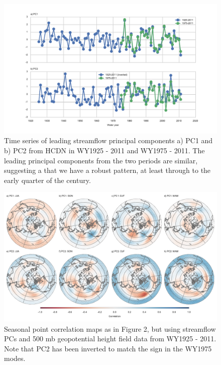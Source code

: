 \documentclass[final, double]{ua-thesis}
\begin{document}
\begin{figure}[ht]
\centering
\centerline{\includegraphics[width=190mm]{p1figures/s4.pdf}}
\caption{Time series of leading streamflow principal components a) PC1 and b) PC2 from HCDN in WY1925 - 2011 and WY1975 - 2011. The leading principal components from the two periods are similar, suggesting a that we have a robust pattern, at least through to the early quarter of the century.}
\label{sfig:pctimeseries}
\end{figure}

\begin{figure}[ht]
\centering
\centerline{\includegraphics[width=190mm]{p1figures/s5.pdf}}
\caption{Seasonal point correlation maps as in Figure 2, but using streamflow PCs and 500 mb geopotential height field data from WY1925 - 2011. Note that PC2 has been inverted to match the sign in the WY1975 modes.}
\label{sfig:corrhgt}
\end{figure}
\end{document}
